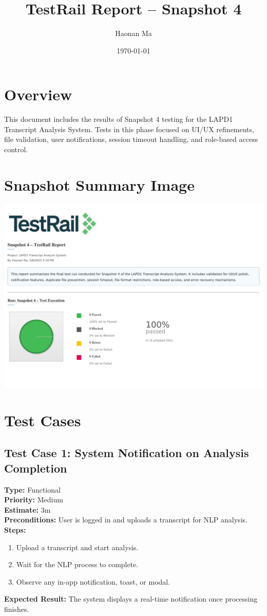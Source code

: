 \documentclass[12pt]{article}
\title{TestRail Report – Snapshot 4}
\author{Haonan Ma}
\date{\today}
\begin{document}
\maketitle

\section*{Overview}
This document includes the results of Snapshot 4 testing for the LAPD1 Transcript Analysis System. Tests in this phase focused on UI/UX refinements, file validation, user notifications, session timeout handling, and role-based access control.

\section*{Snapshot Summary Image}
\begin{center}
    \includegraphics[width=\textwidth]{snapshot4image}
\end{center}

\section*{Test Cases}

\subsection*{Test Case 1: System Notification on Analysis Completion}
\textbf{Type:} Functional \\
\textbf{Priority:} Medium \\
\textbf{Estimate:} 3m \\
\textbf{Preconditions:} User is logged in and uploads a transcript for NLP analysis. \\
\textbf{Steps:}
\begin{enumerate}[label=\arabic*.]
\item Upload a transcript and start analysis.
\item Wait for the NLP process to complete.
\item Observe any in-app notification, toast, or modal.
\end{enumerate}
\textbf{Expected Result:} The system displays a real-time notification once processing finishes.
\end{document}
